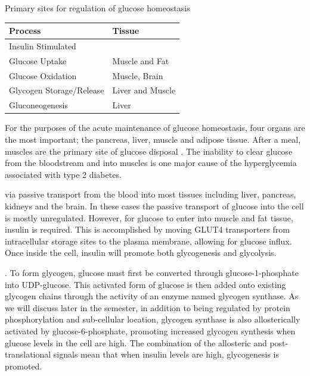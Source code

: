 \documentclass{tufte-handout}
\begin{document}
\begin{margintable}
\caption{Primary sites for regulation of glucose homeostasis}
\label{glucose-sites}
\begin{tabular}{@{}ll@{}}
\textbf{Process }                          & \textbf{Tissue}           \\ \midrule
Insulin Stimulated \\Glucose Uptake & Muscle and Fat   \\ \midrule
Glucose Oxidation & Muscle, Brain \\ \midrule
Glycogen Storage/Release                      & Liver and Muscle   \\ \midrule
Gluconeogenesis & Liver \\ \bottomrule
\end{tabular}
\end{margintable}

For the purposes of the acute maintenance of glucose homeostasis, four organs are the most important; the pancreas, liver, muscle and adipose tissue.  After a meal, muscles are the primary site of glucose disposal \citep{DeFronzo1981}.  The inability to clear glucose from the bloodstream and into muscles is one major cause of the hyperglycemia associated with type 2 diabetes.

 via passive transport from the blood into most tissues including liver, pancreas, kidneys and the brain.  In these cases the passive transport of glucose into the cell is mostly unregulated.  However, for glucose to enter into muscle and fat tissue, insulin is required.  This is accomplished by moving GLUT4 transporters from intracellular storage sites to the plasma membrane, allowing for glucose influx.  Once inside the cell, insulin will promote both glycogenesis and glycolysis.  

.  To form glycogen, glucose must first be converted through glucose-1-phosphate into UDP-glucose.  This activated form of glucose is then added onto existing glycogen chains through the activity of an enzyme named glycogen synthase.  As we will discuss later in the semester, in addition to being regulated by protein phosphorylation and sub-cellular location, glycogen synthase is also allosterically activated by glucose-6-phosphate, promoting increased glycogen synthesis when glucose levels in the cell are high.  The combination of the allosteric and post-translational signals mean that when insulin levels are high, glycogenesis is promoted.
\end{document}

